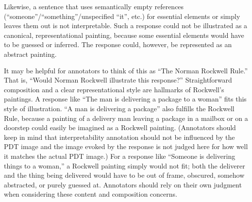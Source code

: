 \documentclass[12pt,notitlepage]{article}
\begin{document}
Likewise, a sentence that uses semantically empty references (``someone''/``something''/unspecified ``it'', etc.) for essential elements or simply leaves them out is not interpretable. Such a response could not be illustrated as a canonical, representational painting, because some essential elements would have to be guessed or inferred. The response could, however, be represented as an abstract painting. 

It may be helpful for annotators to think of this as ``The Norman Rockwell Rule.'' That is, ``Would Norman Rockwell illustrate this response?'' Straightforward composition and a clear representational style are hallmarks of Rockwell's paintings. A response like ``The man is delivering a package to a woman'' fits this style of illustration. ``A man is delivering a package'' also fulfills the Rockwell Rule, because a painting of a delivery man leaving a package in a mailbox or on a doorstep could easily be imagined as a Rockwell painting. (Annotators should keep in mind that interpretability annotation should not be influenced by the PDT image and the image evoked by the response is not judged here for how well it matches the actual PDT image.) For a response like ``Someone is delivering things to a woman,'' a Rockwell painting simply would not fit; both the deliverer and the thing being delivered would have to be out of frame, obscured, somehow abstracted, or purely guessed at. Annotators should rely on their own judgment when considering these content and composition concerns.

\end{document}
